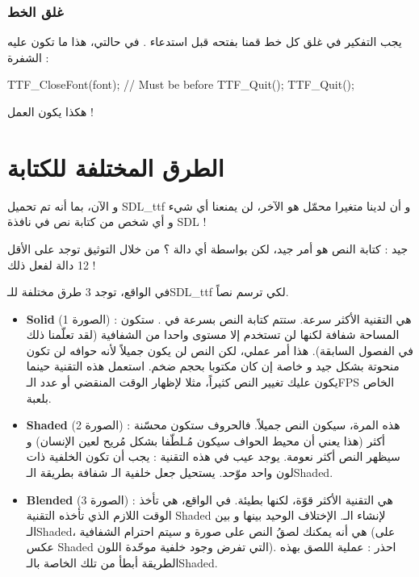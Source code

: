 \subsubsection{غلق الخط}

يجب التفكير في غلق كل خط قمنا بفتحه قبل استدعاء
.
في حالتي، هذا ما تكون عليه الشفرة :

\begin{Csource}
TTF_CloseFont(font); // Must be before TTF_Quit();
TTF_Quit();
\end{Csource}

هكذا يكون العمل !

\section{الطرق المختلفة للكتابة}

و الآن، بما أنه تم تحميل
\textenglish{SDL\_ttf}
و أن لدينا متغيرا 
محمّل هو الآخر، لن يمنعنا أي شيء و أي شخص من كتابة نص في نافذة 
\textenglish{SDL} !

جيد : كتابة النص هو أمر جيد، لكن بواسطة أي دالة ؟ من خلال التوثيق توجد على الأقل 12 دالة لفعل ذلك !

في الواقع، توجد 3 طرق مختلفة للـ\textenglish{SDL\_ttf}
لكي ترسم نصاً.


\begin{itemize}
	\item \textbf{\textenglish{Solid}}
	(الصورة 1) : هي التقنية الأكثر سرعة. ستتم كتابة النص بسرعة في
	.
	ستكون المساحة شفافة لكنها لن تستخدم إلا مستوى واحدا من الشفافية (لقد تعلّمنا ذلك في الفصول السابقة). هذا أمر عملي، لكن النص لن يكون جميلاً لأنه حوافه لن تكون منحوتة بشكل جيد و خاصة إن كان مكتوبا بحجم ضخم. استعمل هذه التقنية حينما يكون عليك تغيير النص كثيراً، مثلا لإظهار الوقت المنقضي أو عدد الـ\textenglish{FPS}
	الخاص بلعبة.
	\item \textbf{\textenglish{Shaded}}
	(الصورة 2) : هذه المرة، سيكون النص جميلاً. فالحروف ستكون محسّنة أكثر (هذا يعني أن محيط الحواف سيكون مُـلطّفا بشكل مُريح لعين الإنسان) و سيظهر النص أكثر نعومة. يوجد عيب في هذه التقنية : يجب أن تكون الخلفية ذات لون واحد موّحد. يستحيل جعل خلفية الـ
	شفافة بطريقة الـ\textenglish{Shaded}.
	\item \textbf{\textenglish{Blended}}
	(الصورة 3) : هي التقنية الأكثر قوّة، لكنها بطيئة. في الواقع، هي تأخذ الوقت اللازم الذي تأخذه التقنية 
	\textenglish{Shaded}
	لإنشاء الـ.
	الإختلاف الوحيد بينها و بين الـ\textenglish{Shaded}،
	هي أنه يمكنك لصقُ النص على صورة و سيتم احترام الشفافية (على عكس
	\textenglish{Shaded}
	التي تفرض وجود خلفية موحّدة اللون). احذر : عملية اللصق بهذه الطريقة أبطأ من تلك الخاصة بالـ\textenglish{Shaded}.
\end{itemize}

